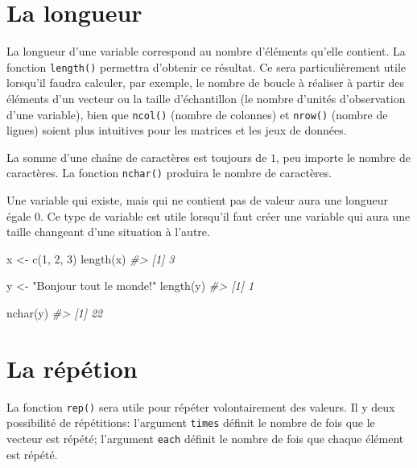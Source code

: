 \documentclass[
]{book}
\newenvironment{Shaded}{}{}
\newcommand{\CommentTok}[1]{\textit{#1}}
\newcommand{\DecValTok}[1]{#1}
\newcommand{\FunctionTok}[1]{#1}
\newcommand{\NormalTok}[1]{#1}
\newcommand{\OtherTok}[1]{#1}
\newcommand{\StringTok}[1]{#1}
\begin{document}
\hypertarget{la-longueur}{%
\section{La longueur}\label{la-longueur}}

La longueur d'une variable correspond au nombre d'éléments qu'elle contient. La fonction \texttt{length()} permettra d'obtenir ce résultat. Ce sera particulièrement utile lorsqu'il faudra calculer, par exemple, le nombre de boucle à réaliser à partir des éléments d'un vecteur ou la taille d'échantillon (le nombre d'unités d'observation d'une variable), bien que \texttt{ncol()} (nombre de colonnes) et \texttt{nrow()} (nombre de lignes) soient plus intuitives pour les matrices et les jeux de données.

La somme d'une chaîne de caractères est toujours de \(1\), peu importe le nombre de caractères. La fonction \texttt{nchar()} produira le nombre de caractères.

Une variable qui existe, mais qui ne contient pas de valeur aura une longueur égale \(0\). Ce type de variable est utile lorsqu'il faut créer une variable qui aura une taille changeant d'une situation à l'autre.

\begin{Shaded}
\begin{Highlighting}[]
\NormalTok{x }\OtherTok{\textless{}{-}} \FunctionTok{c}\NormalTok{(}\DecValTok{1}\NormalTok{, }\DecValTok{2}\NormalTok{, }\DecValTok{3}\NormalTok{)}
\FunctionTok{length}\NormalTok{(x)}
\CommentTok{\#\textgreater{} [1] 3}

\NormalTok{y }\OtherTok{\textless{}{-}} \StringTok{"Bonjour tout le monde!"}
\FunctionTok{length}\NormalTok{(y)}
\CommentTok{\#\textgreater{} [1] 1}

\FunctionTok{nchar}\NormalTok{(y)}
\CommentTok{\#\textgreater{} [1] 22}
\end{Highlighting}
\end{Shaded}

\hypertarget{la-ruxe9puxe9tion}{%
\section{La répétion}\label{la-ruxe9puxe9tion}}

La fonction \texttt{rep()} sera utile pour répéter volontairement des valeurs. Il y deux possibilité de répétitions: l'argument \texttt{times} définit le nombre de fois que le vecteur est répété; l'argument \texttt{each} définit le nombre de fois que chaque élément est répété.
\end{document}
